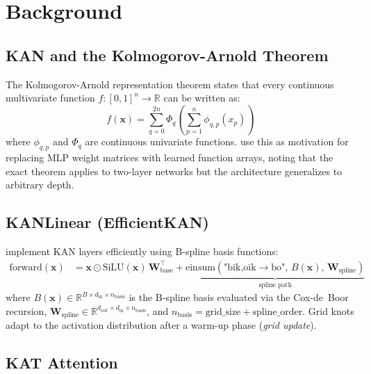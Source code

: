 \documentclass{article}
\begin{document}
\section{Background}
\label{sec:background}

\subsection{KAN and the Kolmogorov-Arnold Theorem}

The Kolmogorov-Arnold representation theorem states that every continuous
multivariate function $f: [0,1]^n \to \mathbb{R}$ can be written as:
\begin{equation}
  f(\mathbf{x}) = \sum_{q=0}^{2n} \Phi_q\!\left(\sum_{p=1}^{n}
    \phi_{q,p}(x_p)\right)
\end{equation}
where $\phi_{q,p}$ and $\Phi_q$ are continuous univariate functions.
\citet{liu2024kan} use this as motivation for replacing MLP weight matrices
with learned function arrays, noting that the exact theorem applies to
two-layer networks but the architecture generalizes to arbitrary depth.

\subsection{KANLinear (EfficientKAN)}
\label{sec:kanlinear}

\citet{blealtan2024efficientkan} implement KAN layers efficiently using
B-spline basis functions:
\begin{align}
  \text{forward}(\mathbf{x}) &= \mathbf{x} \odot \text{SiLU}(\mathbf{x})\,
    \mathbf{W}_\text{base}^\top
    + \underbrace{\text{einsum}(\text{"bik,oik}\to\text{bo"},\,
    B(\mathbf{x}),\,
    \mathbf{W}_\text{spline})}_{\text{spline path}}
\end{align}
where $B(\mathbf{x}) \in \mathbb{R}^{B \times d_\text{in} \times n_\text{basis}}$
is the B-spline basis evaluated via the Cox-de~Boor recursion,
$\mathbf{W}_\text{spline} \in \mathbb{R}^{d_\text{out} \times d_\text{in} \times
n_\text{basis}}$, and $n_\text{basis} = \text{grid\_size} + \text{spline\_order}$.
Grid knots adapt to the activation distribution after a warm-up phase
(\emph{grid update}).

\subsection{KAT Attention}
\label{sec:kat}
\end{document}
